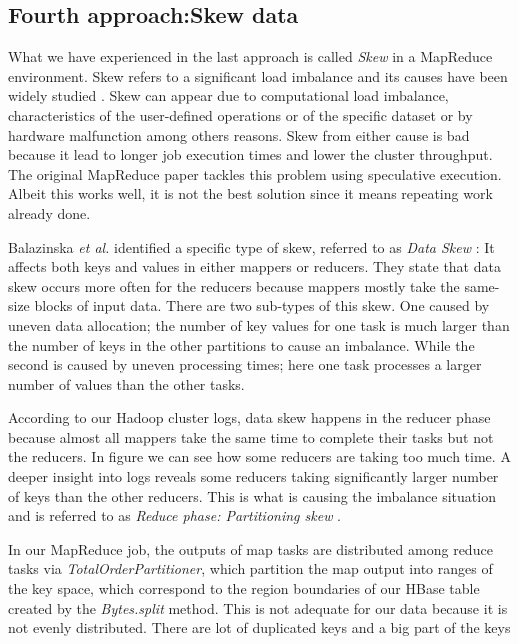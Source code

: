 \subsection{Fourth approach:Skew data}

What we have experienced in the last approach is called \textit{Skew} in a MapReduce environment. Skew refers to a significant load imbalance and its causes have been widely studied \cite{ananthanarayanan2010reining} \cite{dean2008mapreduce} \cite{walton1991taxonomy}. Skew can appear due to computational load imbalance, characteristics of the user-defined operations or of the specific dataset or by hardware malfunction among others reasons. Skew from either cause is bad because it lead to longer job execution times and lower the cluster throughput. The original MapReduce paper \cite{dean2008mapreduce} tackles this problem using speculative execution. Albeit this works well, it is not the best solution since it means repeating work already done.
\par
Balazinska \textit{et al.} identified a specific type of skew, referred to as \textit{Data Skew} \cite{kwon2013managing}: It affects both keys and values in either mappers or reducers. They state that data skew occurs more often for the reducers because mappers mostly take the same-size blocks of input data. There are two sub-types of this skew. One caused by uneven data allocation; the number of key values for one task is much larger than the number of keys in the other partitions to cause an imbalance. While the second is caused by uneven processing times; here one task processes a larger number of values than the other tasks. 
\par
According to our Hadoop cluster logs, data skew happens in the reducer phase because almost all mappers take the same time to complete their tasks but not the reducers. In figure  we can see how some reducers are taking too much time. A deeper insight into logs reveals some reducers taking significantly larger number of keys than the other reducers. This is what is causing the imbalance situation and is referred to as \textit{Reduce phase: Partitioning skew} \cite{kwon2012skewtune}.
\par
In our MapReduce job, the outputs of map tasks are distributed among reduce tasks via \textit{TotalOrderPartitioner}, which partition the map output into ranges of the key space, which correspond to the region boundaries of our HBase table created by the \textit{Bytes.split} method. This is not adequate for our data because it is not evenly distributed. There are lot of duplicated keys and a big part of the keys 
